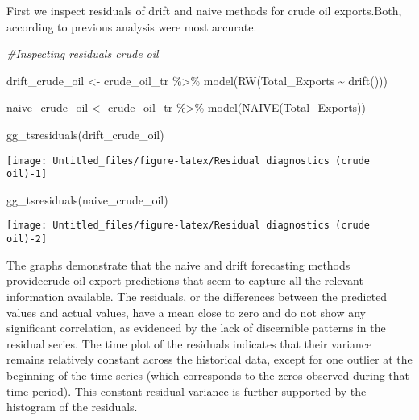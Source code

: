 \documentclass[
]{article}
\newenvironment{Shaded}{\begin{snugshade}}{\end{snugshade}}
\newcommand{\CommentTok}[1]{\textcolor[rgb]{0.56,0.35,0.01}{\textit{#1}}}
\newcommand{\FunctionTok}[1]{\textcolor[rgb]{0.00,0.00,0.00}{#1}}
\newcommand{\NormalTok}[1]{#1}
\newcommand{\OtherTok}[1]{\textcolor[rgb]{0.56,0.35,0.01}{#1}}
\newcommand{\SpecialCharTok}[1]{\textcolor[rgb]{0.00,0.00,0.00}{#1}}
\begin{document}
First we inspect residuals of drift and naive methods for crude oil
exports.Both, according to previous analysis were most accurate.

\begin{Shaded}
\begin{Highlighting}[]
\CommentTok{\#Inspecting residuals crude oil}

\NormalTok{drift\_crude\_oil }\OtherTok{\textless{}{-}}\NormalTok{ crude\_oil\_tr }\SpecialCharTok{\%\textgreater{}\%} 
  \FunctionTok{model}\NormalTok{(}\FunctionTok{RW}\NormalTok{(Total\_Exports }\SpecialCharTok{\textasciitilde{}} \FunctionTok{drift}\NormalTok{()))}

\NormalTok{naive\_crude\_oil }\OtherTok{\textless{}{-}}\NormalTok{ crude\_oil\_tr }\SpecialCharTok{\%\textgreater{}\%} 
  \FunctionTok{model}\NormalTok{(}\FunctionTok{NAIVE}\NormalTok{(Total\_Exports))}

\FunctionTok{gg\_tsresiduals}\NormalTok{(drift\_crude\_oil)}
\end{Highlighting}
\end{Shaded}

\begin{center}\texttt{[image: Untitled\_files/figure-latex/Residual diagnostics (crude oil)-1]} \end{center}

\begin{Shaded}
\begin{Highlighting}[]
\FunctionTok{gg\_tsresiduals}\NormalTok{(naive\_crude\_oil)}
\end{Highlighting}
\end{Shaded}

\begin{center}\texttt{[image: Untitled\_files/figure-latex/Residual diagnostics (crude oil)-2]} \end{center}

The graphs demonstrate that the naive and drift forecasting methods
providecrude oil export predictions that seem to capture all the
relevant information available. The residuals, or the differences
between the predicted values and actual values, have a mean close to
zero and do not show any significant correlation, as evidenced by the
lack of discernible patterns in the residual series. The time plot of
the residuals indicates that their variance remains relatively constant
across the historical data, except for one outlier at the beginning of
the time series (which corresponds to the zeros observed during that
time period). This constant residual variance is further supported by
the histogram of the residuals.
\end{document}
